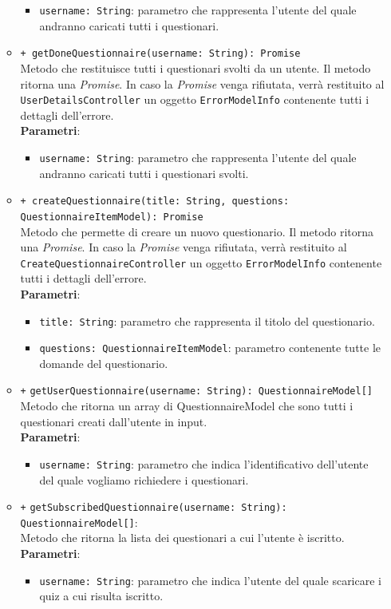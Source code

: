 \begin{itemize}
\begin{itemize}
\begin{itemize}
		\item \texttt{username: String}: parametro che rappresenta l'utente del quale andranno caricati tutti i questionari.
	\end{itemize}
	\item \texttt{+ getDoneQuestionnaire(username: String): Promise} \\ Metodo che restituisce tutti i questionari svolti da un utente. Il metodo ritorna una \textit{Promise}. In caso la \textit{Promise} venga rifiutata, verrà restituito al \texttt{UserDetailsController} un oggetto \texttt{ErrorModelInfo} contenente tutti i dettagli dell'errore. \\
	\textbf{Parametri}: 
	\begin{itemize}
		\item \texttt{username: String}: parametro che rappresenta l'utente del quale andranno caricati tutti i questionari svolti.
	\end{itemize}
	\item \texttt{+ createQuestionnaire(title: String, questions: QuestionnaireItemModel): Promise} \\ Metodo che permette di creare un nuovo questionario. Il metodo ritorna una \textit{Promise}. In caso la \textit{Promise} venga rifiutata, verrà restituito al \texttt{CreateQuestionnaireController} un oggetto \texttt{ErrorModelInfo} contenente tutti i dettagli dell'errore. \\
	\textbf{Parametri}:
	\begin{itemize}
		\item \texttt{title: String}: parametro che rappresenta il titolo del questionario.
		\item \texttt{questions: QuestionnaireItemModel}: parametro contenente tutte le domande del questionario.
	\end{itemize}
	\item \texttt{+} \texttt{getUserQuestionnaire(username: String): QuestionnaireModel[]} \\Metodo che ritorna un array di QuestionnaireModel che sono tutti i questionari creati dall'utente in input.\\
	\textbf{Parametri}:
	\begin{itemize}
		\item \texttt{username: String}: parametro che indica l'identificativo dell'utente del quale vogliamo richiedere i questionari.
	\end{itemize}
	\item \texttt{+} \texttt{getSubscribedQuestionnaire(username: String): QuestionnaireModel[]}: \\Metodo che ritorna la lista dei questionari a cui l'utente è iscritto.\\
	\textbf{Parametri}:
	\begin{itemize}
		\item \texttt{username: String}: parametro che indica l'utente del quale scaricare i quiz a cui risulta iscritto.
	\end{itemize}
\end{itemize}
\end{itemize}


